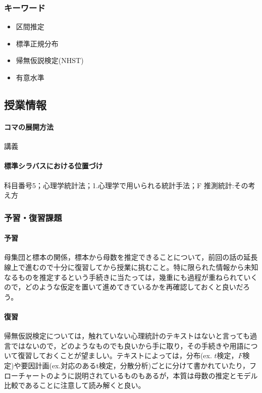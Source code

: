 \subsubsection{キーワード}
\begin{itemize}
\item 区間推定
\item 標準正規分布
\item 帰無仮説検定(NHST)
\item 有意水準
\end{itemize}
\subsection{授業情報}
\paragraph{コマの展開方法}
講義
\paragraph{標準シラバスにおける位置づけ}
科目番号5；心理学統計法；1.心理学で用いられる統計手法；F 推測統計:その考え方
\subsubsection{予習・復習課題}
\paragraph{予習}
母集団と標本の関係，標本から母数を推定できることについて，前回の話の延長線上で進むので十分に復習してから授業に挑むこと。特に限られた情報から未知なるものを推定するという手続きに当たっては，幾重にも過程が重ねられていくので，どのような仮定を置いて進めてきているかを再確認しておくと良いだろう。
\paragraph{復習}
帰無仮説検定については，触れていない心理統計のテキストはないと言っても過言ではないので，どのようなものでも良いから手に取り，その手続きや用語について復習しておくことが望ましい。テキストによっては，分布(ex. $t$検定，$F$検定)や要因計画(ex.対応のあるt検定，分散分析)ごとに分けて書かれていたり，フローチャートのように説明されているものもあるが，本質は母数の推定とモデル比較であることに注意して読み解くと良い。